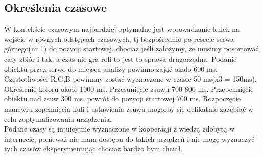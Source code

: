 \documentclass[12pt]{article}
\begin{document}
\subsection{Określenia czasowe}
W kontekście czasowym najbardziej optymalne jest wprowadzanie kulek na wejście w równych odstępach czasowych, tj bezpośrednio po resecie serwa górnego(nr 1) do pozycji startowej, chociaż jeśli założymy, że musimy posortować cały zbiór i tak, a czas nie gra roli to jest to sprawa drugorzędna. Podanie obiektu przez serwo do miejsca analizy powinno zająć około 600 ms. Częstotliwości R,G,B powinnny zostać wyznaczone w czasie 50 ms(x3 = 150ms). Określenie koloru około 1000 ms.  Przesunięcie zsuwu 700-800 ms. Przepchnięcie obiektu nad zsuw 300 ms.
powrót do pozycji startowej 700 ms. Rozpoczęcie manewru zepchnięcia kuli i ustawienia zsuwu mogłoby się delikatnie zazębiać w celu zoptymalizowania urządzenia.\\
Podane czasy są intuicyjnie wyznaczone w kooperacji z wiedzą zdobytą w internecie, ponieważ nie mam dostępu do takich urządzeń i nie mogę wyznaczyć tych czasów eksperymentując chociaż bardzo bym chciał.
\end{document}
